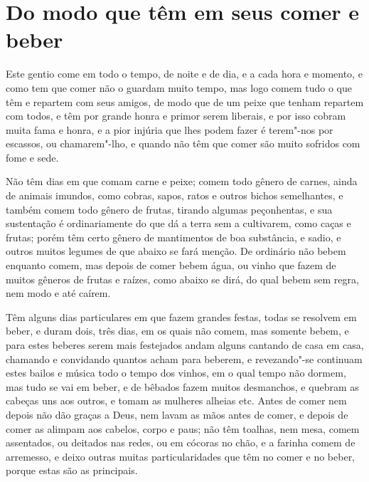 \section{Do modo que têm em seus comer e beber}
Este gentio come em todo o tempo, de noite e de dia, e a cada
hora e momento, e como tem que comer não o guardam muito tempo, mas
logo comem tudo o que têm e repartem com seus amigos, de modo que de um
peixe que tenham repartem com todos, e têm por grande honra e primor
serem liberais, e por isso cobram muita fama e honra, e a pior injúria
que lhes podem fazer é terem"-nos por escassos, ou chamarem"-lho, e
quando não têm que comer são muito sofridos com fome e sede.

 Não têm dias em que comam carne e peixe; comem todo gênero de carnes,
ainda de animais imundos, como cobras, sapos, ratos e outros bichos
semelhantes, e também comem todo gênero de frutas, tirando algumas
peçonhentas, e sua sustentação é ordinariamente do que dá a terra sem
a cultivarem, como caças e frutas; porém têm certo gênero de
mantimentos de boa substância, e sadio, e outros muitos legumes de que
abaixo se fará menção. De ordinário não bebem enquanto comem, mas
depois de comer bebem água, ou vinho que fazem de muitos gêneros de
frutas e raízes, como abaixo se dirá, do qual bebem sem regra, nem modo
e até caírem.

 Têm alguns dias particulares em que fazem grandes festas, todas se
resolvem em beber, e duram dois, três dias, em os quais não comem, mas
somente bebem, e para estes beberes serem mais festejados andam alguns
cantando de casa em casa, chamando e convidando quantos acham para
beberem, e revezando"-se continuam estes bailos e música todo o tempo
dos vinhos, em o qual tempo não dormem, mas tudo se vai em beber, e de
bêbados fazem muitos desmanchos, e quebram as cabeças uns aos outros, e
tomam as mulheres alheias etc. Antes de comer nem depois não dão
graças a Deus, nem lavam as mãos antes de comer, e depois de comer as
alimpam aos cabelos, corpo e paus; não têm toalhas, nem mesa, comem
assentados, ou deitados nas redes, ou em cócoras no chão, e a farinha
comem de arremesso, e deixo outras muitas particularidades que têm no
comer e no beber, porque estas são as principais.

